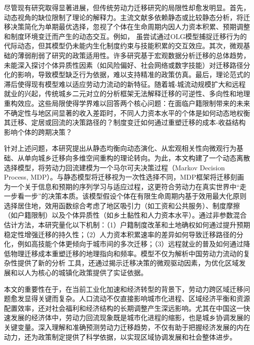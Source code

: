 \documentclass[master, final]{zufe-thesis}
\begin{document}
尽管现有研究取得显著进展，但传统劳动力迁移研究的局限性却愈发明显。首先，动态视角的缺位限制了理论的解释力。主流文献多依赖静态或比较静态分析，将迁移决策简化为单期最优选择，忽视了个体在生命周期内因人力资本积累、预期调整和制度环境变迁而产生的动态交互。例如，
\textcite{HanQiHengNongCunLaoDongLiQianYiMoCaYingXiangNongMinGongShuLiangYuGongZiJieGouMa2018}虽尝试通过OLG模型捕捉迁移行为的代际动态，但其模型仍未能内生化制度约束与技能积累的交互效应。其次，微观基础的薄弱削弱了研究的政策适用性。许多研究基于宏观数据分析迁移的总体趋势，未能深入探讨个体异质性因素（如风险偏好、社会网络或数字技能）对迁移路径分化的影响，导致模型缺乏行为依据，难以支持精准的政策仿真。最后，理论范式的滞后使得现有模型难以适应劳动力流动的新特征。随着城-城流动规模扩大和远程就业的兴起，传统城乡二元对立的分析框架无法解释迁移的可逆性、多向性和地理重构效应。这些局限使得学界难以回答两个核心问题：在面临户籍限制带来的未来不确定性与地区间显著的收入差距时，不同人力资本水平的个体是如何动态地权衡其迁移、定居或回流的决策路径的？制度变迁如何通过重塑迁移的成本-收益结构影响个体的跨期决策？

针对上述问题，本研究提出从静态均衡向动态演化、从宏观相关性向微观行为基础、从单向城乡迁移向多维空间重构的理论转向。为此，本文构建了一个动态离散选择模型，将劳动力回流建模为一个马尔可夫决策过程（Markov Decision Process, MDP）。与静态模型将迁移视为一次性选择不同，MDP框架将迁移刻画为一个关于信息和预期的序列学习与适应过程，这更符合劳动力在真实世界中“走一步看一步”的决策本质。该模型假设个体在有限生命周期内基于效用最大化原则选择居住地，效用函数综合考虑了地区吸引力（如工资和公共服务）、制度摩擦（如户籍限制）以及个体异质性（如乡土黏性和人力资本水平）。通过非参数混合估计方法，本研究量化以下机制：（1）户籍制度改革和土地确权如何通过提升预期稳定性增强迁移的持久性；（2）人力资本积累速率的差异如何导致迁移路径的分化，例如高技能个体更倾向于城市间的多次迁移；（3）远程就业的普及如何通过降低物理迁移成本重塑迁移的地理指向和频率。模型不仅为解析中国劳动力流动的复杂性提供了新的分析 工具，还通过揭示迁移决策的微观驱动因素，为优化区域发展和以人为核心的城镇化政策提供了实证依据。

本文的重要性在于，在当前工业化加速和经济转型的背景下，劳动力跨区域迁移问题愈发显得关键而复杂。人口流动不仅直接影响城市化进程、区域经济平衡和资源配置效率，还对社会福利和经济结构的长期调整产生深远影响。尤其在中国这一快速发展的经济体中，劳动力回流现象既是城市化进程的缩影，也是城乡协调发展的关键变量。深入理解和准确预测劳动力迁移趋势，不仅有助于把握经济发展的内在动力，还为政策制定提供了科学依据，以实现区域协调发展和社会整体进步。
\end{document}
